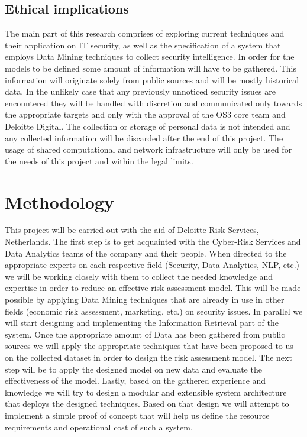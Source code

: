 \documentclass[12pt]{article}
\begin{document}
\subsection{Ethical implications}
The main part of this research comprises of exploring current techniques and their application on IT security, as well as the specification of a system that employs Data Mining techniques to collect security intelligence. In order for the models to be defined some amount of information will have to be gathered. This information will originate solely from public sources and will be mostly historical data. In the unlikely case that any previously unnoticed security issues are encountered they will be handled with discretion and communicated only towards the appropriate targets and only with the approval of the OS3 core team and Deloitte Digital. The collection or storage of personal data is not intended and any collected information will be discarded after the end of this project. The usage of shared computational and network infrastructure will only be used for the needs of this project and within the legal limits.

\section{Methodology}
This project will be carried out with the aid of Deloitte Risk Services, Netherlands. The first step is to get acquainted with the Cyber-Risk Services and Data Analytics teams of the company and their people. When directed to the appropriate experts on each respective field (Security, Data Analytics, NLP, etc.) we will be working closely with them to collect the needed knowledge and expertise in order to reduce an effective risk assessment model. This will be made possible by applying Data Mining techniques that are already in use in other fields (economic risk assessment, marketing, etc.) on security issues. In parallel we will start designing and implementing the Information Retrieval part of the system. Once the appropriate amount of Data has been gathered from public sources we will apply the appropriate techniques that have been proposed to us on the collected dataset in order to design the risk assessment model. The next step will be to apply the designed model on new data and evaluate the effectiveness of the model. Lastly, based on the gathered experience and knowledge we will try to design a modular and extensible system architecture that deploys the designed techniques. Based on that design we will attempt to implement a simple proof of concept that will help us define the resource requirements and operational cost of such a system. 
\end{document}
